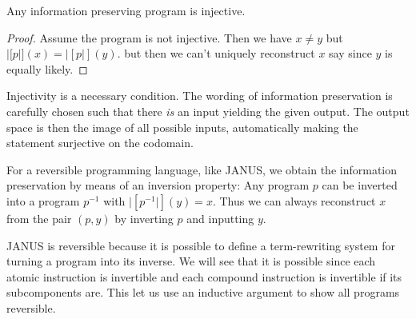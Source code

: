 \begin{thm}
  Any information preserving program is injective.
\end{thm}
\begin{proof}
  Assume the program is not injective. Then we have $x \neq y$ but
  $|[p|](x) = |[p|](y)$. but then we can't uniquely reconstruct $x$
  say since $y$ is equally likely.
\end{proof}
Injectivity is a necessary condition. The wording of information
preservation is carefully chosen such that there \emph{is} an input
yielding the given output. The output space is then the image of all
possible inputs, automatically making the statement surjective on the
codomain.

For a reversible programming language, like JANUS, we obtain the
information preservation by means of an inversion property: Any
program $p$ can be inverted into a program $p^{-1}$ with
$|[p^{-1}|](y) = x$. Thus we can always reconstruct $x$ from the pair
$(p, y)$ by inverting $p$ and inputting $y$.

JANUS is reversible because it is possible to define a term-rewriting
system for turning a program into its inverse. We will see that it is
possible since each atomic instruction is invertible and each compound
instruction is invertible if its subcomponents are. This let us use an
inductive argument to show all programs reversible.

